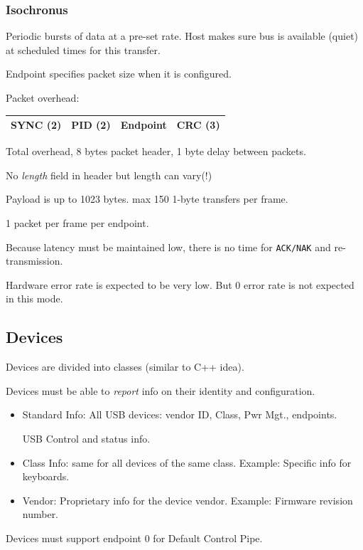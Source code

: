 \subsubsection{Isochronus}

Periodic bursts of data at a pre-set rate.   Host
makes sure bus is available (quiet) at scheduled
times for this transfer.

Endpoint specifies packet size when it is configured.

Packet overhead:

\begin{tabular}{|c|c|c|c| }
\hline
SYNC (2)  & PID (2) & Endpoint & CRC (3)   \\
\hline
\end{tabular}

Total overhead, 8 bytes packet header, 1 byte delay between
packets.

No {\it length} field in header but length can vary(!)

Payload is up to 1023 bytes.  max 150 1-byte transfers
per frame.

1 packet per frame per endpoint.

Because latency must be maintained low, there is
no time for {\tt ACK/NAK} and re-transmission.

Hardware error rate is expected to be very low.
But 0 error rate is not expected in this mode.

\subsection{Devices}

Devices are divided into classes (similar to C++ idea).

Devices must be able to {\it report} info on their identity
and configuration.

\begin{itemize}
        \item Standard Info: All USB devices:
        vendor ID, Class, Pwr Mgt., endpoints.

        USB Control and status info.

        \item Class Info: same for all devices of
        the same class.  Example: Specific info for
        keyboards.

        \item Vendor: Proprietary info for the
        device vendor.  Example: Firmware revision
        number.

\end{itemize}
Devices must support endpoint 0 for Default Control Pipe.

